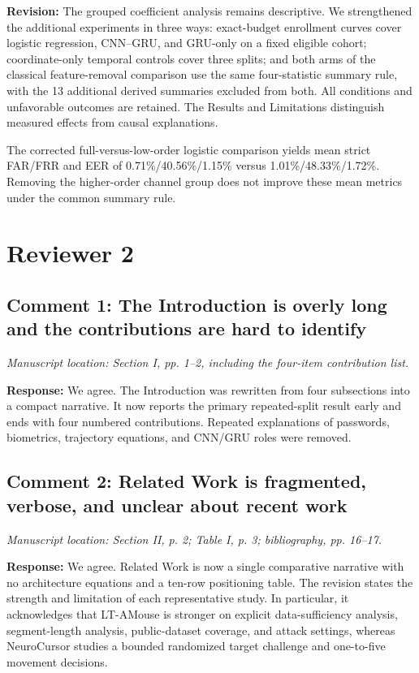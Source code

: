 \documentclass[11pt]{article}
\newcommand{\response}[1]{\par\noindent\textcolor{responseblue}{\textbf{Response:}} #1\par}
\newcommand{\change}[1]{\par\noindent\textcolor{responseblue}{\textbf{Revision:}} #1\par}
\newcommand{\location}[1]{\par\noindent\textit{Manuscript location: #1.}\par}
\begin{document}
\change{The grouped coefficient analysis remains descriptive. We strengthened
the additional experiments in three ways: exact-budget enrollment curves
cover logistic regression, CNN--GRU, and GRU-only on a fixed eligible cohort;
coordinate-only temporal controls cover three splits; and both arms of the
classical feature-removal comparison use the same four-statistic summary
rule, with the 13 additional derived summaries excluded from both. All
conditions and unfavorable outcomes are retained. The Results and Limitations
distinguish measured effects from causal explanations.}

The corrected full-versus-low-order logistic comparison yields mean strict
FAR/FRR and EER of 0.71\%/40.56\%/1.15\% versus
1.01\%/48.33\%/1.72\%. Removing the higher-order channel group does not
improve these mean metrics under the common summary rule.

\section*{Reviewer 2}

\subsection*{Comment 1: The Introduction is overly long and the contributions are hard to identify}
\location{Section I, pp. 1--2, including the four-item contribution list}

\response{We agree. The Introduction was rewritten from four subsections into
a compact narrative. It now reports the primary repeated-split result early and
ends with four numbered contributions. Repeated explanations of passwords,
biometrics, trajectory equations, and CNN/GRU roles were removed.}

\subsection*{Comment 2: Related Work is fragmented, verbose, and unclear about recent work}
\location{Section II, p. 2; Table I, p. 3; bibliography, pp. 16--17}

\response{We agree. Related Work is now a single comparative narrative with no
architecture equations and a ten-row positioning table. The revision states
the strength and limitation of each representative study. In particular, it
acknowledges that LT-AMouse is stronger on explicit data-sufficiency analysis,
segment-length analysis, public-dataset coverage, and attack settings, whereas
NeuroCursor studies a bounded randomized target challenge and one-to-five
movement decisions.}
\end{document}
